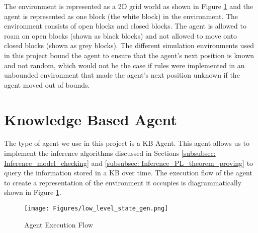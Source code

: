 The environment is represented as a 2D grid world as shown in Figure \ref{fig:agent_in_env_low_level} and the agent is represented as one block (the white block) in the environment. The environment consists of open blocks and closed blocks. The agent is allowed to roam on open blocks (shown as black blocks) and not allowed to move onto closed blocks (shown as grey blocks). The different simulation environments used in this project bound the agent to ensure that the agent's next position is known and not random, which would not be the case if rules were implemented in an unbounded environment that made the agent's next position unknown if the agent moved out of bounds.



\section{Knowledge Based Agent}

The type of agent we use in this project is a KB Agent. This agent allows us to implement the inference algorithms discussed in Sections \ref{subsubsec: Inference_model_checking} and \ref{subsubsec: Inference_PL_theorem_proving} to query the information stored in a KB over time. The execution flow of the agent to create a representation of the environment it occupies is diagrammatically shown in Figure \ref{fig:agent_in_env_low_level}.

\begin{figure}[H]
    \centering
    \texttt{[image: Figures/low\_level\_state\_gen.png]}
    \caption{Agent Execution Flow} 
    \label{fig:agent_in_env_low_level}
\end{figure}

